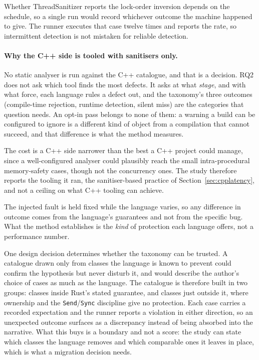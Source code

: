 \documentclass[english,oneside,a4paper,censored,csm,software-track-2020]{HYthesisML}
\begin{document}
Whether ThreadSanitizer reports the lock-order inversion depends on the schedule, so a single run
would record whichever outcome the machine happened to give. The runner executes that case twelve
times and reports the rate, so intermittent detection is not mistaken for reliable detection.

\paragraph{Why the C++ side is tooled with sanitisers only.}
No static analyser is run against the C++ catalogue, and that is a decision. RQ2 does not ask
which tool finds the most defects. It asks at what \emph{stage}, and with what force, each
language rules a defect out, and the taxonomy's three outcomes (compile-time rejection, runtime
detection, silent miss) are the categories that question needs. An opt-in pass belongs to none
of them: a warning a build can be configured to ignore is a different kind of object from a
compilation that cannot succeed, and that difference is what the method measures.

The cost is a C++ side narrower than the best a C++ project could manage, since a well-configured
analyser could plausibly reach the small intra-procedural memory-safety cases, though not the
concurrency ones. The study therefore reports the tooling it ran, the sanitiser-based practice of
Section~\ref{sec:cpplatency}, and not a ceiling on what C++ tooling can achieve.

The injected fault is held fixed while the language varies, so any difference in outcome comes
from the language's guarantees and not from the specific bug. What the method establishes is the
\emph{kind} of protection each language offers, not a performance number.

One design decision determines whether the taxonomy can be trusted. A catalogue drawn only from
classes the language is known to prevent could confirm the hypothesis but never disturb it, and
would describe the author's choice of cases as much as the language. The catalogue is
therefore built in two groups: classes inside Rust's stated guarantee, and classes just outside
it, where ownership and the \texttt{Send}/\texttt{Sync} discipline give no protection. Each case
carries a recorded expectation and the runner reports a violation in either direction, so an
unexpected outcome surfaces as a discrepancy instead of being absorbed into the narrative. What
this buys is a boundary and not a score: the study can state which classes the language removes
and which comparable ones it leaves in place, which is what a migration decision needs.
\end{document}
